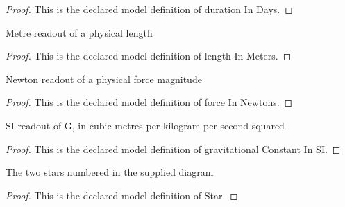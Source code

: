 \begin{proof}
  This is the declared model definition of duration In Days.
\end{proof}
\begin{definition}
  \label{def:physics:phyx-mini-0716:phyxminiproblems-problemphyxmini0716-lengthinmeters}
  Metre readout of a physical length
\end{definition}
\begin{proof}
  This is the declared model definition of length In Meters.
\end{proof}
\begin{definition}
  \label{def:physics:phyx-mini-0716:phyxminiproblems-problemphyxmini0716-forceinnewtons}
  Newton readout of a physical force magnitude
\end{definition}
\begin{proof}
  This is the declared model definition of force In Newtons.
\end{proof}
\begin{definition}
  \label{def:physics:phyx-mini-0716:phyxminiproblems-problemphyxmini0716-gravitationalconstantinsi}
  SI readout of G, in cubic metres per kilogram per second squared
\end{definition}
\begin{proof}
  This is the declared model definition of gravitational Constant In SI.
\end{proof}
\begin{definition}[Star]
  \label{def:physics:phyx-mini-0716:phyxminiproblems-problemphyxmini0716-star}
  The two stars numbered in the supplied diagram
\end{definition}
\begin{proof}
  This is the declared model definition of Star.
\end{proof}
